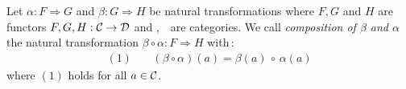 \begin{defin}\label{Nat:def:composition}
    Let $\alpha:F\Rightarrow G$ and $\beta:G\Rightarrow H$ be natural
    transformations where $F,G$ and $H$ are functors $F,G,H:\mbox{$\cal C$}\to\mbox{$\cal D$}$
    and \Cat,\ \Dat\ are categories. We call {\em composition of $\beta$
    and $\alpha$} the natural transformation $\beta\circ\alpha:F\Rightarrow H$
    with\,:
        \begin{eqnarray*}
            (1)&\ &(\beta\circ\alpha)(a)=\beta(a)\,\circ\,\alpha(a)
        \end{eqnarray*}
    where $(1)$ holds for all $a\in\mbox{$\cal C$}$.
\
\end{defin}
